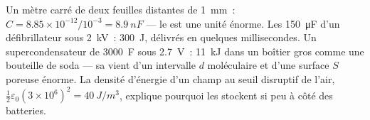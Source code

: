 \begin{example}\label{ex:b1:potential-capacitors:energies}
Un mètre carré de deux feuilles distantes de \qty{1}{mm}~: $C = 8.85 \times 10^{-12}/
10^{-3} = \qty{8.9}{nF}$ --- le  est une unité énorme. Les
\qty{150}{\micro F} d'un défibrillateur sous \qty{2}{kV}~: \qty{300}{J},
délivrés en quelques millisecondes. Un supercondensateur de \qty{3000}{F} sous
\qty{2.7}{V}~: \qty{11}{kJ} dans un boîtier gros comme une bouteille de soda
--- sa  vient d'un intervalle $d$ moléculaire et d'une surface $S$
poreuse énorme. La densité d'énergie d'un champ au seuil disruptif de l'air,
$\tfrac12\varepsilon_0(3 \times 10^6)^2 = \qty{40}{J/m^3}$, explique pourquoi les
 stockent si peu à côté des batteries.
\end{example}

